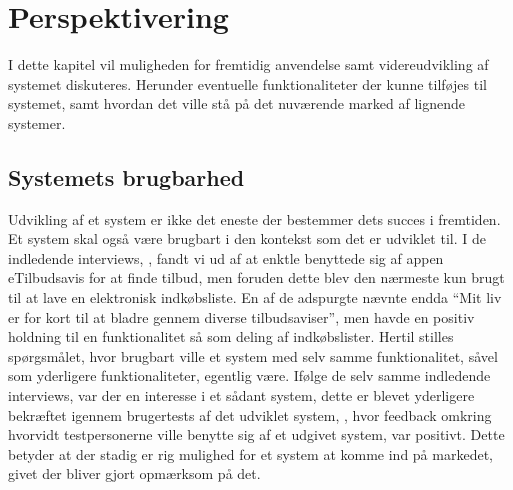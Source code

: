 \chapter{Perspektivering}
I dette kapitel vil muligheden for fremtidig anvendelse samt videreudvikling af systemet diskuteres.
Herunder eventuelle funktionaliteter der kunne tilføjes til systemet, samt hvordan det ville stå på det nuværende marked af lignende systemer.

\section{Systemets brugbarhed}
Udvikling af et system er ikke det eneste der bestemmer dets succes i fremtiden.
Et system skal også være brugbart i den kontekst som det er udviklet til.
I de indledende interviews, , fandt vi ud af at enktle benyttede sig af appen eTilbudsavis for at finde tilbud, men foruden dette blev den nærmeste kun brugt til at lave en elektronisk indkøbsliste.
En af de adspurgte nævnte endda ``Mit liv er for kort til at bladre gennem diverse tilbudsaviser'', men havde en positiv holdning til en funktionalitet så som deling af indkøbslister.
Hertil stilles spørgsmålet, hvor brugbart ville et system med selv samme funktionalitet, såvel som yderligere funktionaliteter, egentlig være.
Ifølge de selv samme indledende interviews, var der en interesse i et sådant system, dette er blevet yderligere bekræftet igennem brugertests af det udviklet system, , hvor feedback omkring hvorvidt testpersonerne ville benytte sig af et udgivet system, var positivt.
Dette betyder at der stadig er rig mulighed for et system at komme ind på markedet, givet der bliver gjort opmærksom på det.

